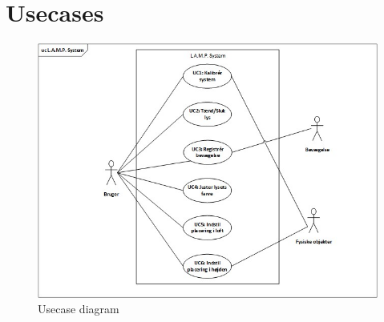 \section{Usecases}

\begin{figure}[H] \centering
    \includegraphics[width=\textwidth]{0_Filer/Figuer/ucLAMP2.jpg}
    \caption{Usecase diagram}
    \label{fig:usecasediagram}
\end{figure}











%

%

%

%
